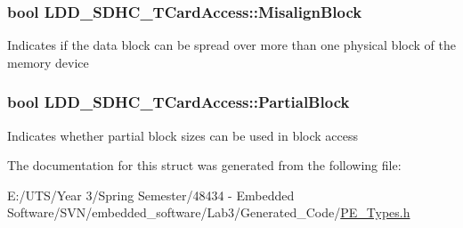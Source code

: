 \subsubsection[{Misalign\+Block}]{\setlength{\rightskip}{0pt plus 5cm}bool L\+D\+D\+\_\+\+S\+D\+H\+C\+\_\+\+T\+Card\+Access\+::\+Misalign\+Block}\label{struct_l_d_d___s_d_h_c___t_card_access_aa56e65353fd03ffdbd8cc8d19537b621}
Indicates if the data block can be spread over more than one physical block of the memory device \hypertarget{struct_l_d_d___s_d_h_c___t_card_access_a9d78668915e934548a04351b20ec2d0a}{}
\subsubsection[{Partial\+Block}]{\setlength{\rightskip}{0pt plus 5cm}bool L\+D\+D\+\_\+\+S\+D\+H\+C\+\_\+\+T\+Card\+Access\+::\+Partial\+Block}\label{struct_l_d_d___s_d_h_c___t_card_access_a9d78668915e934548a04351b20ec2d0a}
Indicates whether partial block sizes can be used in block access 

The documentation for this struct was generated from the following file\+:\begin{DoxyCompactItemize}
\item 
E\+:/\+U\+T\+S/\+Year 3/\+Spring Semester/48434 -\/ Embedded Software/\+S\+V\+N/embedded\+\_\+software/\+Lab3/\+Generated\+\_\+\+Code/\hyperlink{_p_e___types_8h}{P\+E\+\_\+\+Types.\+h}\end{DoxyCompactItemize}

